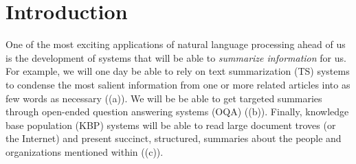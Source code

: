 
\chapter{\label{chap:intro} Introduction}

One of the most exciting applications of natural language processing ahead of us is the development of systems that will be able to \textit{summarize information} for us.
For example, we will one day be able to rely on 
text summarization (TS) systems to condense the most salient information from one or more related articles into as few words as necessary ((a)).
We will be be able to get targeted summaries through open-ended question answering systems (OQA) ((b)).
Finally, knowledge base population (KBP) systems  will be able to read large document troves (or the Internet) and present succinct, structured, summaries about the people and organizations mentioned within ((c)).

